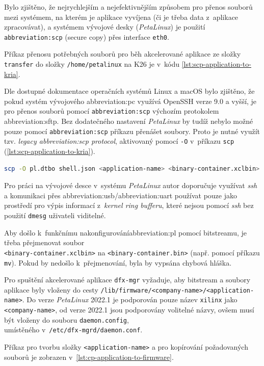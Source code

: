 \documentclass[a4paper, twoside, 11pt]{article}
\begin{document}
	Bylo zjištěno, že nejrychlejším a nejefektivnějším způsobem pro přenos souborů mezi systémem, na kterém je aplikace vyvíjena (či je třeba data z~aplikace zpracovávat), a systémem vývojové desky (\textit{PetaLinux}) je použití \texttt{\gls{abbreviation:scp}} (secure copy) přes interface \texttt{eth0}.\par
	Příkaz přenosu potřebných souborů pro běh akcelerované aplikace ze složky \texttt{transfer} do složky \texttt{/home/petalinux} na K26 je v~kódu \ref{lst:scp-application-to-kria}.\par
	Dle dostupné dokumentace operačních systémů Linux a macOS bylo zjištěno, že pokud systém vývojového \gls{abbreviation:pc} využívá OpenSSH verze 9.0 a vyšší, je pro přenos souborů pomocí \texttt{\gls{abbreviation:scp}} výchozím protokolem \gls{abbreviation:sftp}. Bez dodatečného nastavení \textit{PetaLinux} by tudíž nebylo možné pouze pomocí \texttt{\gls{abbreviation:scp}} příkazu přenášet soubory. Proto je nutné využít tzv. \textit{legacy \gls{abbreviation:scp} protocol}, aktivovaný pomocí \texttt{-O} v~příkazu \texttt{scp} (\ref{lst:scp-application-to-kria}).\par

	\begin{lstlisting}[language={sh}, caption={Příkaz pro přesun souborů pomocí \gls{abbreviation:scp} ze systému, kde byla aplikace vyvíjena do systému PetaLinux na K26 SOM.}, label={lst:scp-application-to-kria}, morekeywords={scp}]
scp -O pl.dtbo shell.json <application-name> <binary-container.xclbin> root@<ip-address-of-eth-interface>:/home/petalinux
\end{lstlisting}

	Pro práci na vývojové desce v~systému \textit{PetaLinux} autor doporučuje využívat \textit{ssh} a komunikaci přes \gls{abbreviation:usb}/\gls{abbreviation:uart} používat pouze jako prostředí pro výpis informací z~\textit{kernel ring bufferu}, které nejsou pomocí \textit{ssh} bez použití \texttt{dmesg} uživateli viditelné.\par
	Aby došlo k~funkčnímu nakonfigurování\gls{abbreviation:pl} pomocí bitstreamu, je třeba přejmenovat soubor\\\texttt{<binary-container.xclbin>} na \texttt{<binary-container.bin>} (např. pomocí příkazu \texttt{mv}). Pokud by nedošlo k~přejmenování, byla by vypsána chybová hláška.\par
	Pro spuštění akcelerované aplikace \texttt{dfx-mgr} vyžaduje, aby bitstream a soubory aplikace byly vloženy do cesty \texttt{/lib/firmware/<company-name>/<application-name>}. Do verze \textit{PetaLinux} 2022.1 je podporován pouze název \texttt{xilinx} jako \texttt{<company-name>}, od verze 2022.1 jsou podporovány volitelné názvy, ovšem musí být vloženy do souboru \texttt{daemon.config},\\umístěného v~\texttt{/etc/dfx-mgrd/daemon.conf}. \cite{xilinx-github-vitis-tutorials-step-2-create-the-software-components} \cite{xilinx-github-dfx-mgr}\par
	Příkaz pro tvorbu složky \texttt{<application-name>} a pro kopírování požadovaných souborů je zobrazen v~\ref{lst:cp-application-to-firmware}.\par
\end{document}
